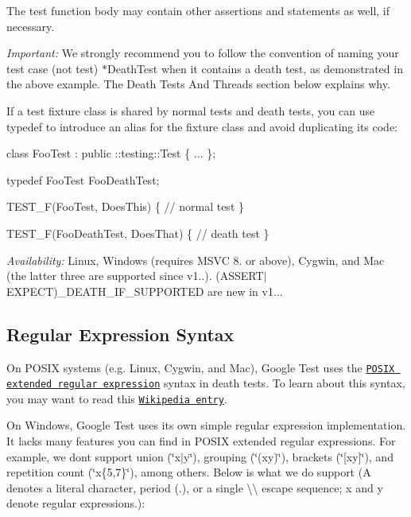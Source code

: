 The test function body may contain other assertions and statements as well, if necessary.

{\itshape Important\+:} We strongly recommend you to follow the convention of naming your test case (not test) {\ttfamily $\ast$\+Death\+Test} when it contains a death test, as demonstrated in the above example. The {\ttfamily Death Tests And Threads} section below explains why.

If a test fixture class is shared by normal tests and death tests, you can use typedef to introduce an alias for the fixture class and avoid duplicating its code\+: 
\begin{DoxyCode}
class FooTest : public ::testing::Test \{ ... \};

typedef FooTest FooDeathTest;

TEST\_F(FooTest, DoesThis) \{
  // normal test
\}

TEST\_F(FooDeathTest, DoesThat) \{
  // death test
\}
\end{DoxyCode}


{\itshape Availability\+:} Linux, Windows (requires M\+S\+VC 8. or above), Cygwin, and Mac (the latter three are supported since v1..). {\ttfamily (A\+S\+S\+E\+R\+T$\vert$\+E\+X\+P\+E\+CT)\+\_\+\+D\+E\+A\+T\+H\+\_\+\+I\+F\+\_\+\+S\+U\+P\+P\+O\+R\+T\+ED} are new in v1...

\subsection*{Regular Expression Syntax}

On P\+O\+S\+IX systems (e.\+g. Linux, Cygwin, and Mac), Google Test uses the \href{http://www.opengroup.org/onlinepubs/009695399/basedefs/xbd_chap09.html#tag_09_04}{\tt P\+O\+S\+IX extended regular expression} syntax in death tests. To learn about this syntax, you may want to read this \href{http://en.wikipedia.org/wiki/Regular_expression#POSIX_Extended_Regular_Expressions}{\tt Wikipedia entry}.

On Windows, Google Test uses its own simple regular expression implementation. It lacks many features you can find in P\+O\+S\+IX extended regular expressions. For example, we don\textquotesingle{}t support union ({\ttfamily \char`\"{}x$\vert$y\char`\"{}}), grouping ({\ttfamily \char`\"{}(xy)\char`\"{}}), brackets ({\ttfamily \char`\"{}\mbox{[}xy\mbox{]}\char`\"{}}), and repetition count ({\ttfamily \char`\"{}x\{5,7\}\char`\"{}}), among others. Below is what we do support ({\ttfamily A} denotes a literal character, period ({\ttfamily .}), or a single {\ttfamily \textbackslash{}\textbackslash{}} escape sequence; {\ttfamily x} and {\ttfamily y} denote regular expressions.)\+:

